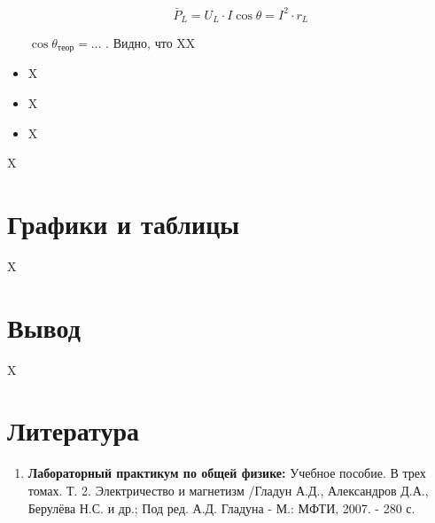 \documentclass[a4paper, 12pt]{article}%
\begin{document}
\begin{itemize}
\begin{equation}
\bar{P}_{L}=U_{L} \cdot I \cos{\theta} =I^{2} \cdot r_{L}
\end{equation}

$\cos{\theta}_{\text{теор}} = \dots $ . Видно, что XX


\item X

\item X

\item X

\end{itemize}

X

\section{Графики и таблицы}

X

\section{Вывод}

X

\section{Литература}

\begin{enumerate}
\item \textbf{Лабораторный практикум по общей физике:} Учебное пособие. В трех томах. Т. 2. Электричество и магнетизм /Гладун А.Д., Александров Д.А., Берулёва Н.С. и др.; Под ред. А.Д. Гладуна - М.: МФТИ, 2007. - 280 с.
\end{enumerate}		
		
					
\end{document}
